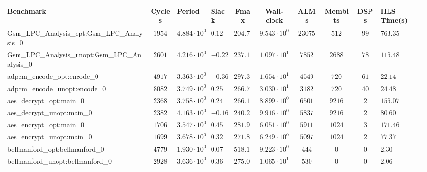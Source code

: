 \begin{tabular}{|l|c|HHc|c|c|c|cH|}
\hline
Benchmark                                       & Cycles       & Period                 & Slack     & Fmax       & Wall-clock              & ALMs       & Membits     & DSPs    & HLS Time(s) \\
\hline
Gsm\_LPC\_Analysis\_opt:Gsm\_LPC\_Analysis\_0   & $ 1954     $ & $ 4.884 \cdot 10^{0} $ & $ 0.12  $ & $ 204.75 $ & $ 9.543 \cdot 10^{0}  $ & $ 23075  $ & $ 512     $ & $ 99  $ & $ 763.35  $ \\
Gsm\_LPC\_Analysis\_unopt:Gsm\_LPC\_Analysis\_0 & $ 2601     $ & $ 4.216 \cdot 10^{0} $ & $ -0.22 $ & $ 237.19 $ & $ 1.097 \cdot 10^{1}  $ & $ 7852   $ & $ 2688    $ & $ 78  $ & $ 116.48  $ \\
adpcm\_encode\_opt:encode\_0                    & $ 4917     $ & $ 3.363 \cdot 10^{0} $ & $ -0.36 $ & $ 297.35 $ & $ 1.654 \cdot 10^{1}  $ & $ 4549   $ & $ 720     $ & $ 61  $ & $ 22.14   $ \\
adpcm\_encode\_unopt:encode\_0                  & $ 8082     $ & $ 3.749 \cdot 10^{0} $ & $ 0.25  $ & $ 266.74 $ & $ 3.030 \cdot 10^{1}  $ & $ 3182   $ & $ 720     $ & $ 40  $ & $ 24.48   $ \\
aes\_decrypt\_opt:main\_0                       & $ 2368     $ & $ 3.758 \cdot 10^{0} $ & $ 0.24  $ & $ 266.10 $ & $ 8.899 \cdot 10^{0}  $ & $ 6501   $ & $ 9216    $ & $ 2   $ & $ 156.07  $ \\
aes\_decrypt\_unopt:main\_0                     & $ 2382     $ & $ 4.163 \cdot 10^{0} $ & $ -0.16 $ & $ 240.21 $ & $ 9.916 \cdot 10^{0}  $ & $ 5837   $ & $ 9216    $ & $ 2   $ & $ 80.60   $ \\
aes\_encrypt\_opt:main\_0                       & $ 1706     $ & $ 3.547 \cdot 10^{0} $ & $ 0.45  $ & $ 281.93 $ & $ 6.051 \cdot 10^{0}  $ & $ 5911   $ & $ 1024    $ & $ 3   $ & $ 171.46  $ \\
aes\_encrypt\_unopt:main\_0                     & $ 1699     $ & $ 3.678 \cdot 10^{0} $ & $ 0.32  $ & $ 271.89 $ & $ 6.249 \cdot 10^{0}  $ & $ 5097   $ & $ 1024    $ & $ 2   $ & $ 77.37   $ \\
bellmanford\_opt:bellmanford\_0                 & $ 4779     $ & $ 1.930 \cdot 10^{0} $ & $ 0.07  $ & $ 518.13 $ & $ 9.223 \cdot 10^{0}  $ & $ 444    $ & $ 0       $ & $ 0   $ & $ 2.30    $ \\
bellmanford\_unopt:bellmanford\_0               & $ 2928     $ & $ 3.636 \cdot 10^{0} $ & $ 0.36  $ & $ 275.03 $ & $ 1.065 \cdot 10^{1}  $ & $ 530    $ & $ 0       $ & $ 0   $ & $ 2.06    $ \\

\end{tabular}
